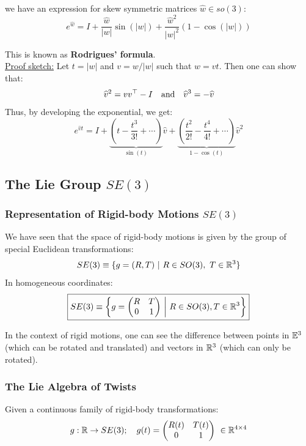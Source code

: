 we have an expression for skew symmetric matrices $\widehat{w} \in so(3)$:
	\[\boxed{
	e^{\widehat{w}} = I + \frac{\widehat{w}}{|w|} \sin(|w|)
		+ \frac{\widehat{w}^2}{|w|^2} (1 - \cos(|w|))}\]

This is known as \textbf{Rodrigues' formula}.\\

\underline{Proof sketch:}
Let $t = |w|$ and $v = w/|w|$ such that $w = vt$. Then one can show that:
	\[\widehat{v}^2 = vv^{\top} - I \quad
	\text{and}\quad \widehat{v}^3 = -\widehat{v}\]
Thus, by developing the exponential, we get:
	\[e^{\widehat{v}t} = I +
		\underbrace{\left( t - \frac{t^3}{3!} + \cdots \right)}_{\sin(t)}\widehat{v}
	+ \underbrace{\left(\frac{t^2}{2!}-\frac{t^4}{4!}+\cdots \right)}_{1-\cos(t)}
		\widehat{v}^2\]


\subsection{The Lie Group $SE(3)$}%
\label{sub:the_lie_group_se_3_}


\subsubsection{Representation of Rigid-body Motions $SE(3)$}%
\label{ssub:representation_of_rigid_body_motions_se_3_}

We have seen that the space of rigid-body motions is given by
the group of special Euclidean transformations:
	\[SE(3) \equiv \{ g = (R,T)\ |\ R \in SO(3),\ T \in \mathbb{R}^3\}\]
In homogeneous coordinates:
	\[\boxed{SE(3) \equiv
	\left\{ g = \begin{pmatrix}
		R & T \\
		0 & 1 \\
	\end{pmatrix}\ \middle|\ R \in SO(3), T \in \mathbb{R}^3\right\}}\]

In the context of rigid motions, one can see the difference
between points in $\mathbb{E}^3$ (which can be rotated and translated)
and vectors in $\mathbb{R}^3$ (which can only be rotated).


\subsubsection{The Lie Algebra of Twists}%
\label{ssub:the_lie_algebra_of_twists}

Given a continuous family of rigid-body transformations:
	\[g : \mathbb{R} \rightarrow SE(3);\quad g(t) = \begin{pmatrix}
		R(t) & T(t) \\
		0 & 1 \\
	\end{pmatrix}\ \in \mathbb{R}^{4 \times{} 4}\]

